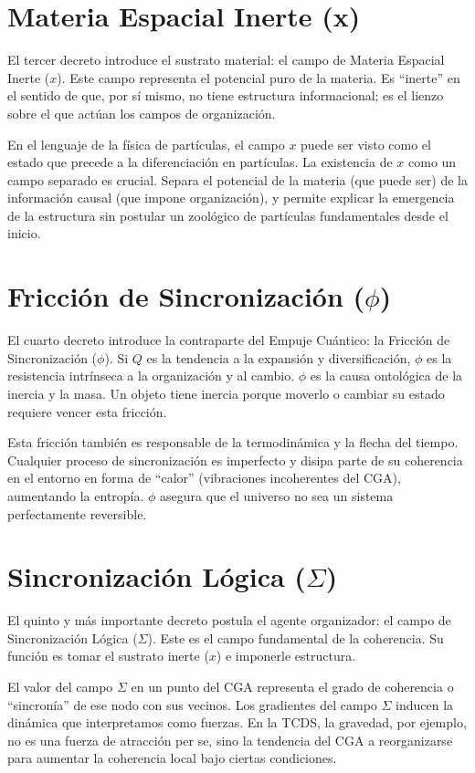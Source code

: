 \documentclass[12pt,openright]{book}
\newcommand{\CGA}{CGA}
\begin{document}
\section{Materia Espacial Inerte (x)}
El tercer decreto introduce el sustrato material: el campo de Materia Espacial Inerte (\(x\)). Este campo representa el potencial puro de la materia. Es ``inerte'' en el sentido de que, por sí mismo, no tiene estructura informacional; es el lienzo sobre el que actúan los campos de organización.

En el lenguaje de la física de partículas, el campo \(x\) puede ser visto como el estado que precede a la diferenciación en partículas. La existencia de \(x\) como un campo separado es crucial. Separa el potencial de la materia (que puede ser) de la información causal (que impone organización), y permite explicar la emergencia de la estructura sin postular un zoológico de partículas fundamentales desde el inicio.

\section{Fricción de Sincronización (\(\phi\))}
El cuarto decreto introduce la contraparte del Empuje Cuántico: la Fricción de Sincronización (\(\phi\)). Si \(Q\) es la tendencia a la expansión y diversificación, \(\phi\) es la resistencia intrínseca a la organización y al cambio. \(\phi\) es la causa ontológica de la inercia y la masa. Un objeto tiene inercia porque moverlo o cambiar su estado requiere vencer esta fricción.

Esta fricción también es responsable de la termodinámica y la flecha del tiempo. Cualquier proceso de sincronización es imperfecto y disipa parte de su coherencia en el entorno en forma de ``calor'' (vibraciones incoherentes del \CGA{}), aumentando la entropía. \(\phi\) asegura que el universo no sea un sistema perfectamente reversible.

\section{Sincronización Lógica (\(\Sigma\))}
El quinto y más importante decreto postula el agente organizador: el campo de Sincronización Lógica (\(\Sigma\)). Este es el campo fundamental de la coherencia. Su función es tomar el sustrato inerte (\(x\)) e imponerle estructura.

El valor del campo \(\Sigma\) en un punto del \CGA{} representa el grado de coherencia o ``sincronía'' de ese nodo con sus vecinos. Los gradientes del campo \(\Sigma\) inducen la dinámica que interpretamos como fuerzas. En la TCDS, la gravedad, por ejemplo, no es una fuerza de atracción per se, sino la tendencia del \CGA{} a reorganizarse para aumentar la coherencia local bajo ciertas condiciones.
\end{document}
